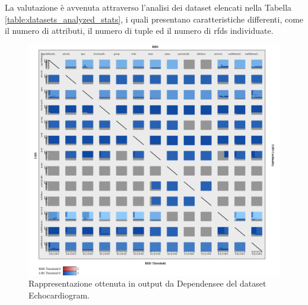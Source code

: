 La valutazione \`{e} avvenuta attraverso l'analisi dei dataset elencati nella Tabella \ref{table:datasets_analyzed_stats}, i quali presentano caratteristiche differenti, come il numero di attributi, il numero di tuple ed il numero di \acrshort{rfds} individuate.
\begin{figure}[ht]
    \centering
    \includegraphics[width=\linewidth]{capitoli/figure/echocardiogram}
    \caption{Rappresentazione ottenuta in output da Dependensee del dataset Echocardiogram.}
    \label{fig:echocardiogram_result}
\end{figure}
